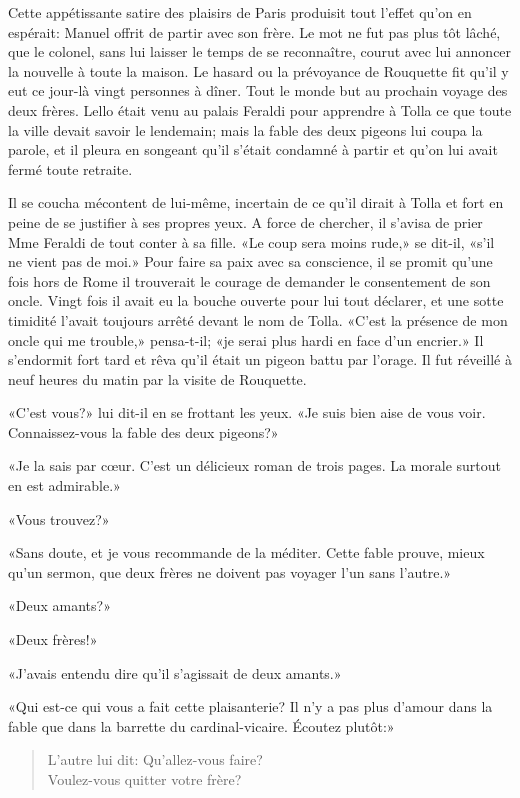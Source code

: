 Cette appétissante satire des plaisirs de Paris produisit tout l'effet
qu'on en espérait: Manuel offrit de partir avec son frère. Le mot ne fut
pas plus tôt lâché, que le colonel, sans lui laisser le temps de se
reconnaître, courut avec lui annoncer la nouvelle à toute la maison. Le
hasard ou la prévoyance de Rouquette fit qu'il y eut ce jour-là vingt
personnes à dîner. Tout le monde but au prochain voyage des deux frères.
Lello était venu au palais Feraldi pour apprendre à Tolla ce que toute
la ville devait savoir le lendemain; mais la fable des deux pigeons lui
coupa la parole, et il pleura en songeant qu'il s'était condamné à
partir et qu'on lui avait fermé toute retraite.

Il se coucha mécontent de lui-même, incertain de ce qu'il dirait à Tolla
et fort en peine de se justifier à ses propres yeux. A force de
chercher, il s'avisa de prier Mme Feraldi de tout conter à sa fille. «Le
coup sera moins rude,» se dit-il, «s'il ne vient pas de moi.» Pour faire
sa paix avec sa conscience, il se promit qu'une fois hors de Rome il
trouverait le courage de demander le consentement de son oncle. Vingt
fois il avait eu la bouche ouverte pour lui tout déclarer, et une sotte
timidité l'avait toujours arrêté devant le nom de Tolla. «C'est la
présence de mon oncle qui me trouble,» pensa-t-il; «je serai plus hardi
en face d'un encrier.» Il s'endormit fort tard et rêva qu'il était un
pigeon battu par l'orage. Il fut réveillé à neuf heures du matin par la
visite de Rouquette.

«C'est vous?» lui dit-il en se frottant les yeux. «Je suis bien aise de
vous voir. Connaissez-vous la fable des deux pigeons?»

«Je la sais par cœur. C'est un délicieux roman de trois pages. La morale
surtout en est admirable.»

«Vous trouvez?»

«Sans doute, et je vous recommande de la méditer. Cette fable prouve,
mieux qu'un sermon, que deux frères ne doivent pas voyager l'un sans
l'autre.»

«Deux amants?»

«Deux frères!»

«J'avais entendu dire qu'il s'agissait de deux amants.»

«Qui est-ce qui vous a fait cette plaisanterie? Il n'y a pas plus
d'amour dans la fable que dans la barrette du cardinal-vicaire. Écoutez
plutôt:»

\begin{quote}
L’autre lui dit: Qu’allez-vous faire?\\
Voulez-vous quitter votre frère?
\end{quote}

